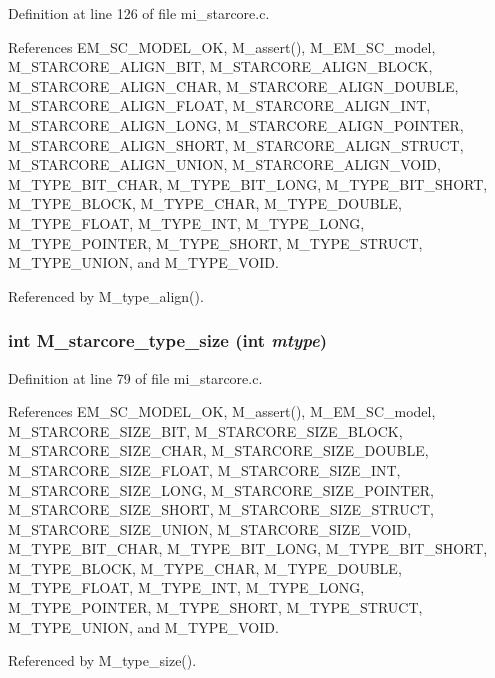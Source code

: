 Definition at line 126 of file mi\_\-starcore.c.

References EM\_\-SC\_\-MODEL\_\-OK, M\_\-assert(), M\_\-EM\_\-SC\_\-model, M\_\-STARCORE\_\-ALIGN\_\-BIT, M\_\-STARCORE\_\-ALIGN\_\-BLOCK, M\_\-STARCORE\_\-ALIGN\_\-CHAR, M\_\-STARCORE\_\-ALIGN\_\-DOUBLE, M\_\-STARCORE\_\-ALIGN\_\-FLOAT, M\_\-STARCORE\_\-ALIGN\_\-INT, M\_\-STARCORE\_\-ALIGN\_\-LONG, M\_\-STARCORE\_\-ALIGN\_\-POINTER, M\_\-STARCORE\_\-ALIGN\_\-SHORT, M\_\-STARCORE\_\-ALIGN\_\-STRUCT, M\_\-STARCORE\_\-ALIGN\_\-UNION, M\_\-STARCORE\_\-ALIGN\_\-VOID, M\_\-TYPE\_\-BIT\_\-CHAR, M\_\-TYPE\_\-BIT\_\-LONG, M\_\-TYPE\_\-BIT\_\-SHORT, M\_\-TYPE\_\-BLOCK, M\_\-TYPE\_\-CHAR, M\_\-TYPE\_\-DOUBLE, M\_\-TYPE\_\-FLOAT, M\_\-TYPE\_\-INT, M\_\-TYPE\_\-LONG, M\_\-TYPE\_\-POINTER, M\_\-TYPE\_\-SHORT, M\_\-TYPE\_\-STRUCT, M\_\-TYPE\_\-UNION, and M\_\-TYPE\_\-VOID.

Referenced by M\_\-type\_\-align().
\subsubsection{\setlength{\rightskip}{0pt plus 5cm}int M\_\-starcore\_\-type\_\-size (int {\em mtype})}\label{m__starcore_8h_d005e63661bf877f53eb5b8a8f63d8ae}




Definition at line 79 of file mi\_\-starcore.c.

References EM\_\-SC\_\-MODEL\_\-OK, M\_\-assert(), M\_\-EM\_\-SC\_\-model, M\_\-STARCORE\_\-SIZE\_\-BIT, M\_\-STARCORE\_\-SIZE\_\-BLOCK, M\_\-STARCORE\_\-SIZE\_\-CHAR, M\_\-STARCORE\_\-SIZE\_\-DOUBLE, M\_\-STARCORE\_\-SIZE\_\-FLOAT, M\_\-STARCORE\_\-SIZE\_\-INT, M\_\-STARCORE\_\-SIZE\_\-LONG, M\_\-STARCORE\_\-SIZE\_\-POINTER, M\_\-STARCORE\_\-SIZE\_\-SHORT, M\_\-STARCORE\_\-SIZE\_\-STRUCT, M\_\-STARCORE\_\-SIZE\_\-UNION, M\_\-STARCORE\_\-SIZE\_\-VOID, M\_\-TYPE\_\-BIT\_\-CHAR, M\_\-TYPE\_\-BIT\_\-LONG, M\_\-TYPE\_\-BIT\_\-SHORT, M\_\-TYPE\_\-BLOCK, M\_\-TYPE\_\-CHAR, M\_\-TYPE\_\-DOUBLE, M\_\-TYPE\_\-FLOAT, M\_\-TYPE\_\-INT, M\_\-TYPE\_\-LONG, M\_\-TYPE\_\-POINTER, M\_\-TYPE\_\-SHORT, M\_\-TYPE\_\-STRUCT, M\_\-TYPE\_\-UNION, and M\_\-TYPE\_\-VOID.

Referenced by M\_\-type\_\-size().
